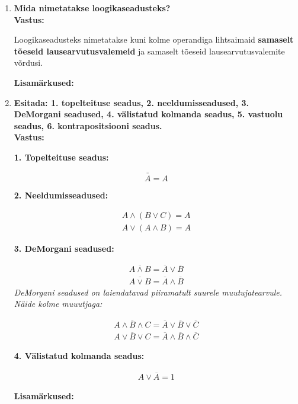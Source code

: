 \documentclass[a4paper,12pt]{article}
\makeatletter
\newcommand{\hl}[1]{\begin{highlightbox}#1\end{highlightbox}}
\newenvironment{question}[1]{%
  \item \textbf{#1} \vspace{0.5em} \\ %
  \textbf{Vastus:} \vspace{0.25em} \\ %
  \def\@lisamarkused{} %
}{%
  \if\relax\detokenize\expandafter{\@lisamarkused}\relax %
  \else
    \vspace{0.5em} %
    \textbf{Lisamärkused:} \\ %
    \@lisamarkused %
  \fi
  \vspace{1em} %
}
\makeatother
\begin{document}
\begin{enumerate}[left=0pt]
\begin{question}{Mida nimetatakse loogikaseadusteks?}
  Loogikaseadusteks nimetatakse kuni kolme operandiga lihtsaimaid \textbf{samaselt tõeseid lausearvutusvalemeid} ja samaselt 
  tõeseid lausearvutusvalemite võrdusi.

\end{question}
\newpage
\begin{question}{Esitada: 1. topelteituse seadus, 2. neeldumisseadused, 3. DeMorgani seadused, 4. välistatud kolmanda seadus, 5. vastuolu seadus, 6. kontrapositsiooni seadus.}
  \newline  
  \textbf{1. Topelteituse seadus:}
  \hl{\[\overline{\overline{A}} = {A}\]} 
  \leavevmode 

  \textbf{2. Neeldumisseadused: } 
  \hl{\[ 
    \begin{align*}  
    A \wedge (B \vee C) = A 
    \\ 
    A \vee (A \wedge B) = A
  \end{align*}
  \]}
  \leavevmode 
  
  \textbf{3. DeMorgani seadused: }
  \hl{
    \[ 
    \begin{align*}
      \overline{A \wedge B} = \overline{A} \vee \overline{B} 
      \\ 
      \overline{A \vee B} = \overline{A} \wedge \overline{B}
    \end{align*}
    \]
    \textit{DeMorgani seadused on laiendatavad piiramatult suurele muutujatearvule. \\ 
    Näide kolme muuutjaga: }

    \[ 
    \begin{align*}
      \overline{A \wedge B \wedge C} = \overline{A} \vee \overline{B} \vee \overline{C}
      \\ 
      \overline{A \vee B \vee C} = \overline{A} \wedge \overline{B} \wedge \overline{C}
    \end{align*}
    \]
  }
  \leavevmode 

  \textbf{4. Välistatud kolmanda seadus: } 
  \hl{\[ 
    \begin{align*}
      A \vee \overline{A} = 1
    \end{align*}
  \]} 
\end{question}
 \leavevmode 


\end{enumerate}
\end{document}
